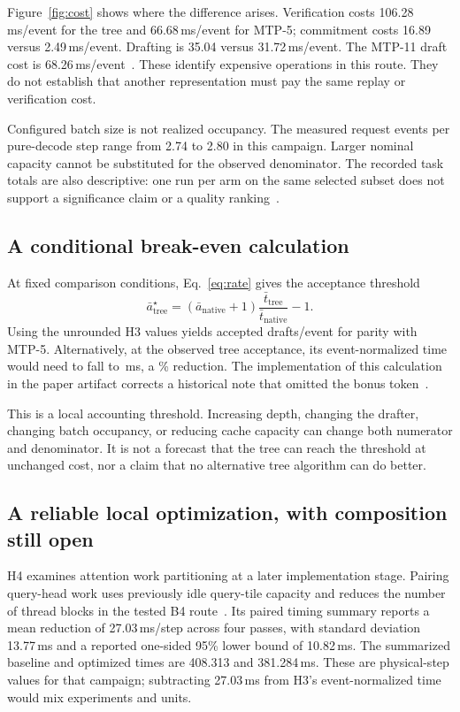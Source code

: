 \documentclass[conference]{IEEEtran}
\begin{document}
Figure~\ref{fig:cost} shows where the difference arises. Verification costs 106.28\,ms/event for the tree and 66.68\,ms/event for MTP-5; commitment costs 16.89 versus 2.49\,ms/event. Drafting is 35.04 versus 31.72\,ms/event. The MTP-11 draft cost is 68.26\,ms/event~\cite{lumo2026archive}. These identify expensive operations in this route. They do not establish that another representation must pay the same replay or verification cost.

Configured batch size is not realized occupancy. The measured request events per pure-decode step range from 2.74 to 2.80 in this campaign. Larger nominal capacity cannot be substituted for the observed denominator. The recorded task totals are also descriptive: one run per arm on the same selected subset does not support a significance claim or a quality ranking~\cite{lumo2026cost,lumo2026archive}.

\subsection{A conditional break-even calculation}
At fixed comparison conditions, Eq.~\eqref{eq:rate} gives the acceptance threshold
\begin{equation}
\bar a_{\mathrm{tree}}^{\star}
= (\bar a_{\mathrm{native}}+1)
\frac{\bar t_{\mathrm{tree}}}{\bar t_{\mathrm{native}}}-1.
\end{equation}
Using the unrounded H3 values yields \BreakEvenAccepted{} accepted drafts/event for parity with MTP-5. Alternatively, at the observed tree acceptance, its event-normalized time would need to fall to \BreakEvenEventMs{}\,ms, a \RequiredReduction\% reduction. The implementation of this calculation in the paper artifact corrects a historical note that omitted the bonus token~\cite{lumo2026archive}.

This is a local accounting threshold. Increasing depth, changing the drafter, changing batch occupancy, or reducing cache capacity can change both numerator and denominator. It is not a forecast that the tree can reach the threshold at unchanged cost, nor a claim that no alternative tree algorithm can do better.

\subsection{A reliable local optimization, with composition still open}
H4 examines attention work partitioning at a later implementation stage. Pairing query-head work uses previously idle query-tile capacity and reduces the number of thread blocks in the tested B4 route~\cite{lumo2026paired}. Its paired timing summary reports a mean reduction of 27.03\,ms/step across four passes, with standard deviation 13.77\,ms and a reported one-sided 95\% lower bound of 10.82\,ms. The summarized baseline and optimized times are 408.313 and 381.284\,ms. These are physical-step values for that campaign; subtracting 27.03\,ms from H3's event-normalized time would mix experiments and units.
\end{document}
